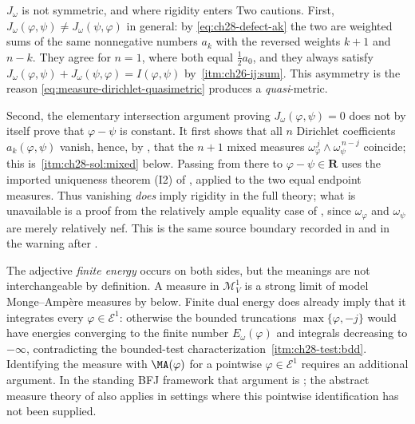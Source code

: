 \begin{warning}{$J_\omega$ is not symmetric, and where rigidity enters}
Two cautions.  First, $J_\omega(\varphi,\psi)\neq J_\omega(\psi,\varphi)$
in general: by \eqref{eq:ch28-defect-ak} the two are weighted sums of the
same nonnegative numbers $a_k$ with the reversed weights $k+1$ and
$n-k$.  They agree for $n=1$, where both equal $\tfrac12a_0$, and they
always satisfy
$J_\omega(\varphi,\psi)+J_\omega(\psi,\varphi)=I(\varphi,\psi)$ by
\,\cref{itm:ch26-ij:sum}.  This
asymmetry is the reason
\eqref{eq:measure-dirichlet-quasimetric} produces a \emph{quasi}-metric.

Second, the elementary intersection argument proving
$J_\omega(\varphi,\psi)=0$ does not by itself prove that
$\varphi-\psi$ is constant.  It first shows that all $n$ Dirichlet
coefficients $a_k(\varphi,\psi)$ vanish, hence, by
, that the $n+1$ mixed measures
$\omega_\varphi^{\,j}\wedge\omega_\psi^{\,n-j}$ coincide; this is
\,\cref{itm:ch28-sol:mixed} below.  Passing from
there to $\varphi-\psi\in\mathbf R$ uses the imported uniqueness theorem
\textup{(I2)} of , applied to the two equal endpoint
measures.  Thus vanishing \emph{does} imply rigidity in the full theory;
what is unavailable is a proof from the relatively ample equality case of
, since $\omega_\varphi$ and
$\omega_\psi$ are merely relatively nef.  This is the same source
boundary recorded in  and in the warning after
.
\end{warning}

\begin{remark}
\label{rem:ch28-two-energies}
The adjective \emph{finite energy} occurs on both sides, but the meanings
are not interchangeable by definition.  A measure in
$\mathcal M^1_V$ is a strong limit of model Monge--Amp\`ere measures by
 below.  Finite dual energy does
already imply that it integrates every $\varphi\in\mathcal E^1$: otherwise
the bounded truncations $\max\{\varphi,-j\}$ would have energies converging
to the finite number $E_\omega(\varphi)$ and integrals decreasing to
$-\infty$, contradicting the bounded-test characterization
\,\cref{itm:ch28-test:bdd}.  Identifying the measure with $\MA(\varphi)$ for a pointwise
$\varphi\in\mathcal E^1$ requires an additional argument.  In the
standing BFJ framework that argument is
; the abstract measure theory of
\cite{BJ25FiniteEnergy} also applies in settings where this pointwise
identification has not been supplied.
\end{remark}

